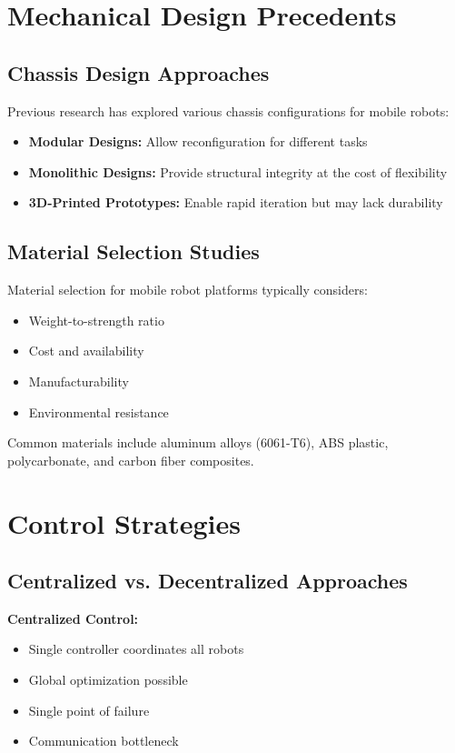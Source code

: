 \section{Mechanical Design Precedents}
\label{sec:mechanical_precedents}

\subsection{Chassis Design Approaches}
Previous research has explored various chassis configurations for mobile robots:

\begin{itemize}
    \item \textbf{Modular Designs:} Allow reconfiguration for different tasks
    \item \textbf{Monolithic Designs:} Provide structural integrity at the cost of flexibility
    \item \textbf{3D-Printed Prototypes:} Enable rapid iteration but may lack durability
\end{itemize}

\subsection{Material Selection Studies}
Material selection for mobile robot platforms typically considers:
\begin{itemize}
    \item Weight-to-strength ratio
    \item Cost and availability
    \item Manufacturability
    \item Environmental resistance
\end{itemize}

Common materials include aluminum alloys (6061-T6), ABS plastic, polycarbonate, and carbon fiber composites.


\section{Control Strategies}
\label{sec:control_strategies}

\subsection{Centralized vs. Decentralized Approaches}

\textbf{Centralized Control:}
\begin{itemize}
    \item Single controller coordinates all robots
    \item Global optimization possible
    \item Single point of failure
    \item Communication bottleneck
\end{itemize}

